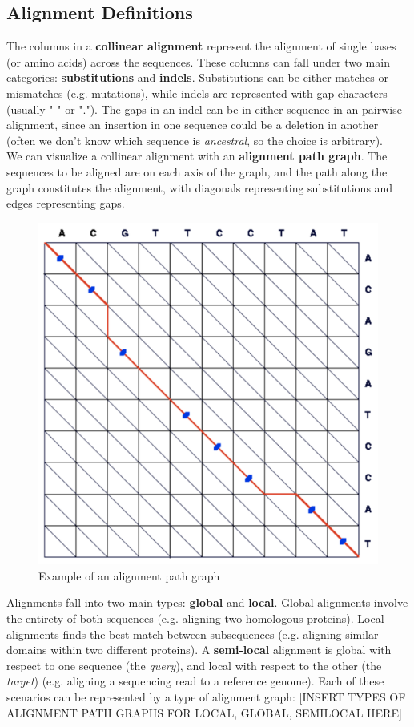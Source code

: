 \documentclass[12pt]{article}
\begin{document}
\subsection{Alignment Definitions}
The columns in a \textbf{collinear alignment} represent the alignment of single bases (or amino acids) across the sequences. These columns can fall under two main categories: \textbf{substitutions} and \textbf{indels}. Substitutions can be either matches or mismatches (e.g. mutations), while indels are represented with gap characters (usually "-" or "."). The gaps in an indel can be in either sequence in an pairwise alignment, since an insertion in one sequence could be a deletion in another (often we don't know which sequence is \textit{ancestral}, so the choice is arbitrary).\\[10pt]
We can visualize a collinear alignment with an \textbf{alignment path graph}. The sequences to be aligned are on each axis of the graph, and the path along the graph constitutes the alignment, with diagonals representing substitutions and edges representing gaps.
\begin{figure}[h]
    \centering
    \includegraphics[width=.3\linewidth]{alignment_graph.png}
    \caption{Example of an alignment path graph}
    \label{fig:align_graph}
\end{figure}
Alignments fall into two main types: \textbf{global} and \textbf{local}. Global alignments involve the entirety of both sequences (e.g. aligning two homologous proteins). Local alignments finds the best match between subsequences (e.g. aligning similar domains within two different proteins). A \textbf{semi-local} alignment is global with respect to one sequence (the \textit{query}), and local with respect to the other (the \textit{target}) (e.g. aligning a sequencing read to a reference genome). Each of these scenarios can be represented by a type of alignment graph: [INSERT TYPES OF ALIGNMENT PATH GRAPHS FOR LOCAL, GLOBAL, SEMILOCAL HERE]
\end{document}
